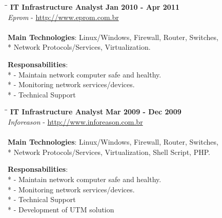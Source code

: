 \documentclass[margin]{res}
\begin{document}
\begin{resume}
\vspace{-0.1in}
\begin{tabbing}
  \hspace{2.3in}\= \hspace{1.7in}\= \kill %
  \textbf{IT Infrastructure Analyst}    \>\>\textbf{Jan 2010 - Apr 2011}\\
  \textit{Eprom} - \url{http://www.eprom.com.br}\\\\
  \textbf{Main Technologies}: Linux/Windows, Firewall, Router, Switches,\\* 
  Network Protocols/Services, Virtualization.
\end{tabbing}\vspace{-20pt}      %
\vspace{2mm}\textbf{Responsabilities}: \\*
  - Maintain network computer safe and healthy. \\*
  - Monitoring network services/devices. \\*
  - Technical Support\\

\vspace{-0.1in}
\begin{tabbing}
  \hspace{2.3in}\= \hspace{1.7in}\= \kill %
  \textbf{IT Infrastructure Analyst}    \>\>\textbf{Mar 2009 - Dec 2009}\\
  \textit{Inforeason} - \url{http://www.inforeason.com.br}\\\\
  \textbf{Main Technologies}: Linux/Windows, Firewall, Router, Switches,\\* 
  Network Protocols/Services, Virtualization, Shell Script, PHP.
\end{tabbing}\vspace{-20pt}      %
\vspace{2mm}\textbf{Responsabilities}: \\*
  - Maintain network computer safe and healthy. \\*
  - Monitoring network services/devices. \\*
  - Technical Support \\*
  - Development of UTM solution\\


\end{resume}
\end{document}
